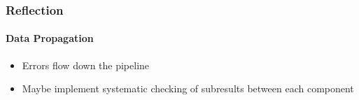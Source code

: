 \begin{frame}
    \frametitle{Reflection}
    \framesubtitle{Data Propagation}
    \begin{itemize}
			\item Errors flow down the pipeline
			\item Maybe implement systematic checking of subresults between each component
		\end{itemize}
\end{frame}
